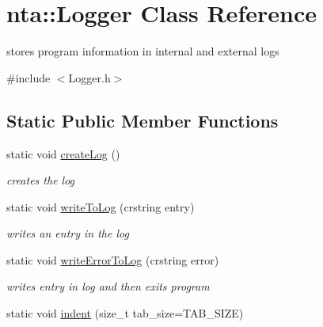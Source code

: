 \hypertarget{classnta_1_1Logger}{}\section{nta\+:\+:Logger Class Reference}
\label{classnta_1_1Logger}


stores program information in internal and external logs  




{\ttfamily \#include $<$Logger.\+h$>$}

\subsection*{Static Public Member Functions}
\begin{DoxyCompactItemize}
\item 
\mbox{\label{classnta_1_1Logger_a308a3ec22f996556b3d54737ace33543}} 
static void \hyperlink{classnta_1_1Logger_a308a3ec22f996556b3d54737ace33543}{create\+Log} ()
\begin{DoxyCompactList}\small\item\em creates the log \end{DoxyCompactList}\item 
\mbox{\label{classnta_1_1Logger_a71196417598ddd975959924c2ce53c13}} 
static void \hyperlink{classnta_1_1Logger_a71196417598ddd975959924c2ce53c13}{write\+To\+Log} (crstring entry)
\begin{DoxyCompactList}\small\item\em writes an entry in the log \end{DoxyCompactList}\item 
\mbox{\label{classnta_1_1Logger_a08299f1414203eba74b306ce6712192e}} 
static void \hyperlink{classnta_1_1Logger_a08299f1414203eba74b306ce6712192e}{write\+Error\+To\+Log} (crstring error)
\begin{DoxyCompactList}\small\item\em writes entry in log and then exits program \end{DoxyCompactList}\item 
\mbox{\label{classnta_1_1Logger_aae8be3709ec3023f987f9b70304cd641}} 
static void \hyperlink{classnta_1_1Logger_aae8be3709ec3023f987f9b70304cd641}{indent} (size\+\_\+t tab\+\_\+size=T\+A\+B\+\_\+\+S\+I\+ZE)

\end{DoxyCompactItemize}
